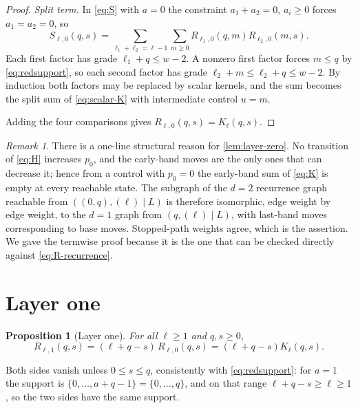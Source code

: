 \documentclass[11pt,reqno]{amsart}
\newtheorem{proposition}[theorem]{Proposition}
\theoremstyle{definition}
\theoremstyle{remark}
\newtheorem{remark}[theorem]{Remark}
\begin{document}
\begin{proof}
\emph{Split term.}  In \eqref{eq:S} with $a=0$ the constraint
$a_1+a_2=0$, $a_i\geq0$ forces $a_1=a_2=0$, so
\[
 S_{\ell,0}(q,s)=\sum_{\ell_1+\ell_2=\ell-1}\sum_{m\geq0}
 R_{\ell_1,0}(q,m)R_{\ell_2,0}(m,s).
\]
Each first factor has grade $\ell_1+q\leq w-2$.  A nonzero first factor
forces $m\leq q$ by \eqref{eq:redsupport}, so each second factor has grade
$\ell_2+m\leq\ell_2+q\leq w-2$.  By induction both factors may be replaced
by scalar kernels, and the sum becomes the split sum of
\eqref{eq:scalar-K} with intermediate control $u=m$.

Adding the four comparisons gives $R_{\ell,0}(q,s)=K_\ell(q,s)$.
\end{proof}

\begin{remark}\label{rem:layer-zero-structural}
There is a one-line structural reason for \cref{lem:layer-zero}.  No
transition of \eqref{eq:H} increases $p_0$, and the early-band moves are the
only ones that can decrease it; hence from a control with $p_0=0$ the
early-band sum of \eqref{eq:K} is empty at every reachable state.  The
subgraph of the $d=2$ recurrence graph reachable from
$((0,q),(\ell)\mid L)$ is therefore isomorphic, edge weight by edge weight,
to the $d=1$ graph from $(q,(\ell)\mid L)$, with last-band moves
corresponding to base moves.  Stopped-path weights agree, which is the
assertion.  We gave the termwise proof because it is the one that can be
checked directly against \eqref{eq:R-recurrence}.
\end{remark}

\section{Layer one}\label{sec:layer1}

\begin{proposition}[Layer one]\label{prop:layer-one}
For all $\ell\geq1$ and $q,s\geq0$,
\begin{equation}\label{eq:layer-one}
 R_{\ell,1}(q,s)=(\ell+q-s)\,R_{\ell,0}(q,s)=(\ell+q-s)K_\ell(q,s).
\end{equation}
\end{proposition}

Both sides vanish unless $0\leq s\leq q$, consistently with
\eqref{eq:redsupport}: for $a=1$ the support is $\{0,\ldots,a+q-1\}
=\{0,\ldots,q\}$, and on that range $\ell+q-s\geq\ell\geq1$, so the two
sides have the same support.
\end{document}
